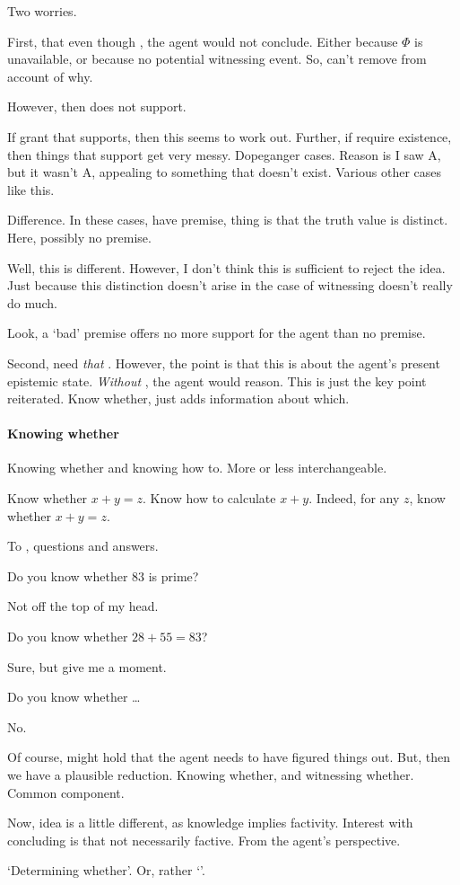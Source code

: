 \begin{note}
  Two worries.

  First, that even though , the agent would not conclude.
  Either because \(\Phi\) is unavailable, or because no potential witnessing event.
  So, can't remove  from account of why.

  However, then  does not support.

  If grant that  supports, then this seems to work out.
  Further, if require existence, then things that support get very messy.
  Dopeganger cases.
  Reason is I saw A, but it wasn't A, appealing to something that doesn't exist.
  Various other cases like this.

  Difference.
  In these cases, have premise, thing is that the truth value is distinct.
  Here, possibly no premise.

  Well, this is different.
  However, I don't think this is sufficient to reject the idea.
  Just because this distinction doesn't arise in the case of witnessing doesn't really do much.

  Look, a `bad' premise offers no more support for the agent than no premise.

  Second, need \emph{that} .
  However, the point is that this is about the agent's present epistemic state.
  \emph{Without} , the agent would reason.
  This is just the key point reiterated.
  Know whether,  just adds information about which.
\end{note}

\paragraph{Knowing whether}

\begin{note}
  Knowing whether and knowing how to.
  More or less interchangeable.

  Know whether \(x + y = z\).
  Know how to calculate \(x + y\).
  Indeed, for any \(z\), know whether \(x + y = z\).
\end{note}

\begin{note}
  To , questions and answers.

  Do you know whether \(83\) is prime?

  Not off the top of my head.

  Do you know whether \(28 + 55 = 83\)?

  Sure, but give me a moment.

  Do you know whether \dots

  No.

  Of course, might hold that the agent needs to have figured things out.
  But, then we have a plausible reduction.
  Knowing whether, and witnessing whether.
  Common component.

  Now, idea is a little different, as knowledge implies factivity.
  Interest with concluding is that not necessarily factive.
  From the agent's perspective.

  `Determining whether'.
  Or, rather `'.
\end{note}


